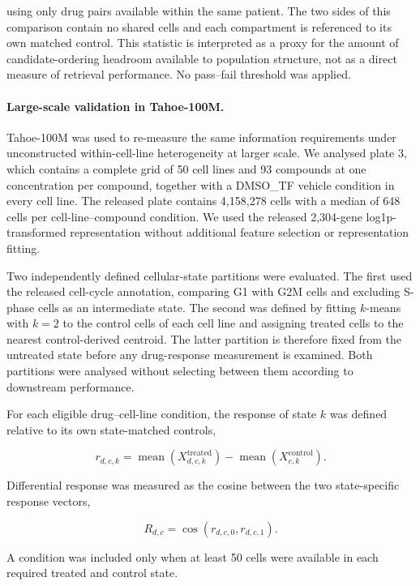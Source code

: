\documentclass[11pt,letterpaper]{article}
\begin{document}
using only drug pairs available within the same patient. The two sides of this comparison contain
no shared cells and each compartment is referenced to its own matched control. This statistic is
interpreted as a proxy for the amount of candidate-ordering headroom available to population
structure, not as a direct measure of retrieval performance. No pass--fail threshold was applied.

\paragraph{Large-scale validation in Tahoe-100M.}
Tahoe-100M\cite{Tahoe100M} was used to re-measure the same information requirements under
unconstructed within-cell-line heterogeneity at larger scale. We analysed plate 3, which contains a
complete grid of 50 cell lines and 93 compounds at one concentration per compound, together with a
DMSO\_TF vehicle condition in every cell line. The released plate contains 4,158,278 cells with a
median of 648 cells per cell-line--compound condition. We used the released 2,304-gene
log1p-transformed representation without additional feature selection or representation fitting.

Two independently defined cellular-state partitions were evaluated. The first used the released
cell-cycle annotation, comparing G1 with G2M cells and excluding S-phase cells as an intermediate
state. The second was defined by fitting $k$-means with $k=2$ to the control cells of each cell
line and assigning treated cells to the nearest control-derived centroid. The latter partition is
therefore fixed from the untreated state before any drug-response measurement is examined. Both
partitions were analysed without selecting between them according to downstream performance.

For each eligible drug--cell-line condition, the response of state $k$ was defined relative to its
own state-matched controls,

$$
r_{d,c,k}
=
\operatorname{mean}
\left(
X^{\mathrm{treated}}_{d,c,k}
\right)
-
\operatorname{mean}
\left(
X^{\mathrm{control}}_{c,k}
\right).
$$

Differential response was measured as the cosine between the two state-specific response vectors,

$$
R_{d,c}
=
\cos
\left(
r_{d,c,0},
r_{d,c,1}
\right).
$$

A condition was included only when at least 50 cells were available in each required treated and
control state.
\end{document}
